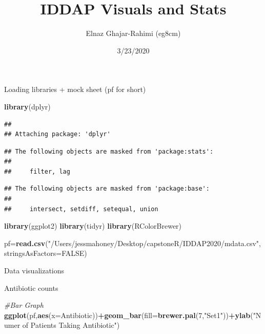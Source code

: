 \documentclass[]{article}
\title{IDDAP Visuals and Stats}
\author{Elnaz Ghajar-Rahimi (eg8cm)}
\date{3/23/2020}
\newenvironment{Shaded}{\begin{snugshade}}{\end{snugshade}}
\newcommand{\CommentTok}[1]{\textcolor[rgb]{0.56,0.35,0.01}{\textit{#1}}}
\newcommand{\DataTypeTok}[1]{\textcolor[rgb]{0.13,0.29,0.53}{#1}}
\newcommand{\DecValTok}[1]{\textcolor[rgb]{0.00,0.00,0.81}{#1}}
\newcommand{\KeywordTok}[1]{\textcolor[rgb]{0.13,0.29,0.53}{\textbf{#1}}}
\newcommand{\NormalTok}[1]{#1}
\newcommand{\OperatorTok}[1]{\textcolor[rgb]{0.81,0.36,0.00}{\textbf{#1}}}
\newcommand{\OtherTok}[1]{\textcolor[rgb]{0.56,0.35,0.01}{#1}}
\newcommand{\StringTok}[1]{\textcolor[rgb]{0.31,0.60,0.02}{#1}}
\begin{document}
\maketitle

Loading libraries + mock sheet (pf for short)

\begin{Shaded}
\begin{Highlighting}[]
\KeywordTok{library}\NormalTok{(dplyr)}
\end{Highlighting}
\end{Shaded}

\begin{verbatim}
## 
## Attaching package: 'dplyr'
\end{verbatim}

\begin{verbatim}
## The following objects are masked from 'package:stats':
## 
##     filter, lag
\end{verbatim}

\begin{verbatim}
## The following objects are masked from 'package:base':
## 
##     intersect, setdiff, setequal, union
\end{verbatim}

\begin{Shaded}
\begin{Highlighting}[]
\KeywordTok{library}\NormalTok{(ggplot2)}
\KeywordTok{library}\NormalTok{(tidyr)}
\KeywordTok{library}\NormalTok{(RColorBrewer)}

\NormalTok{pf=}\KeywordTok{read.csv}\NormalTok{(}\StringTok{"/Users/jessmahoney/Desktop/capstoneR/IDDAP2020/mdata.csv"}\NormalTok{,}\DataTypeTok{stringsAsFactors=}\OtherTok{FALSE}\NormalTok{)}
\end{Highlighting}
\end{Shaded}

Data visualizations

Antibiotic counts

\begin{Shaded}
\begin{Highlighting}[]
\CommentTok{#Bar Graph}
\KeywordTok{ggplot}\NormalTok{(pf,}\KeywordTok{aes}\NormalTok{(}\DataTypeTok{x=}\NormalTok{Antibiotic))}\OperatorTok{+}\KeywordTok{geom_bar}\NormalTok{(}\DataTypeTok{fill=}\KeywordTok{brewer.pal}\NormalTok{(}\DecValTok{7}\NormalTok{,}\StringTok{"Set1"}\NormalTok{))}\OperatorTok{+}\KeywordTok{ylab}\NormalTok{(}\StringTok{"Numer of Patients Taking Antibiotic"}\NormalTok{)}
\end{Highlighting}
\end{Shaded}
\end{document}

